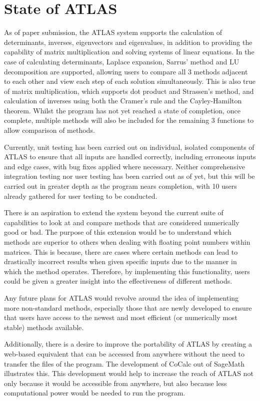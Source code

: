 \documentclass[natbib]{llncs}
\begin{document}
\section{State of ATLAS}
As of paper submission, the ATLAS system supports the calculation of determinants, inverses, eigenvectors and eigenvalues, in addition to providing the capability of matrix multiplication and solving systems of linear equations. In the case of calculating determinants, Laplace expansion, Sarrus' method and LU decomposition are supported, allowing users to compare all 3 methods adjacent to each other and view each step of each solution simultaneously. This is also true of matrix multiplication, which supports dot product and Strassen's method, and calculation of inverses using both the Cramer's rule and the Cayley-Hamilton theorem. Whilst the program has not yet reached a state of completion, once complete, multiple methods will also be included for the remaining 3 functions to allow comparison of methods.

Currently, unit testing has been carried out on individual, isolated components of ATLAS to ensure that all inputs are handled correctly, including erroneous inputs and edge cases, with bug fixes applied where necessary. Neither comprehensive integration testing nor user testing has been carried out as of yet, but this will be carried out in greater depth as the program nears completion, with 10 users already gathered for user testing to be conducted.

There is an aspiration to extend the system beyond the current suite of capabilities to look at and compare methods that are considered numerically good or bad. The purpose of this extension would be to understand which methods are superior to others when dealing with floating point numbers within matrices. This is because, there are cases where certain methods can lead to drastically incorrect results when given specific inputs due to the manner in which the method operates. Therefore, by implementing this functionality, users could be given a greater insight into the effectiveness of different methods.

Any future plans for ATLAS would revolve around the idea of implementing more non-standard methods, especially those that are newly developed to ensure that users have access to the newest and most efficient (or numerically most stable) methods available. 

Additionally, there is a desire to improve the portability of ATLAS by creating a web-based equivalent that can be accessed from anywhere without the need to transfer the files of the program. The development of CoCalc out of SageMath illustrates this. This development would help to increase the reach of ATLAS not only because it would be accessible from anywhere, but also because less computational power would be needed to run the program. 
\end{document}
